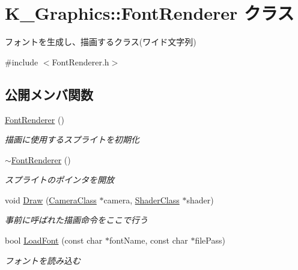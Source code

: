 \hypertarget{class_k___graphics_1_1_font_renderer}{}\section{K\+\_\+\+Graphics\+:\+:Font\+Renderer クラス}
\label{class_k___graphics_1_1_font_renderer}


フォントを生成し、描画するクラス(ワイド文字列)  




{\ttfamily \#include $<$Font\+Renderer.\+h$>$}

\subsection*{公開メンバ関数}
\begin{DoxyCompactItemize}
\item 
\mbox{\hyperlink{class_k___graphics_1_1_font_renderer_a1c3ac227f5eb40934d5d5ea84c80c96b}{Font\+Renderer}} ()
\begin{DoxyCompactList}\small\item\em 描画に使用するスプライトを初期化 \end{DoxyCompactList}\item 
\mbox{\hyperlink{class_k___graphics_1_1_font_renderer_a0b3a9b0d7fa0e07342be6469e668b7cd}{$\sim$\+Font\+Renderer}} ()
\begin{DoxyCompactList}\small\item\em スプライトのポインタを開放 \end{DoxyCompactList}\item 
void \mbox{\hyperlink{class_k___graphics_1_1_font_renderer_a90ee7dabacdc9c324b6e422cd7402b89}{Draw}} (\mbox{\hyperlink{class_k___graphics_1_1_camera_class}{Camera\+Class}} $\ast$camera, \mbox{\hyperlink{class_k___graphics_1_1_shader_class}{Shader\+Class}} $\ast$shader)
\begin{DoxyCompactList}\small\item\em 事前に呼ばれた描画命令をここで行う \end{DoxyCompactList}\item 
bool \mbox{\hyperlink{class_k___graphics_1_1_font_renderer_a9fffd9b8ec36986810cfbaad1d58ab70}{Load\+Font}} (const char $\ast$font\+Name, const char $\ast$file\+Pass)
\begin{DoxyCompactList}\small\item\em フォントを読み込む \end{DoxyCompactList}\item 

\end{DoxyCompactItemize}
